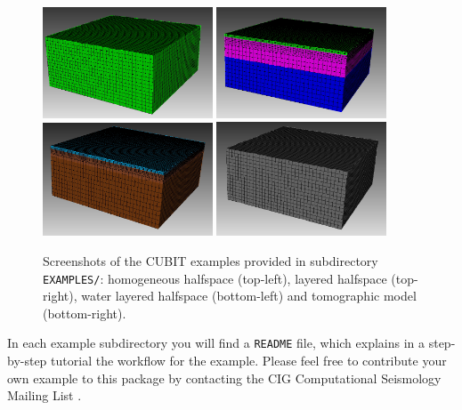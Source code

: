 \begin{figure}[htbp]
\begin{centering}
\includegraphics[width=0.45\textwidth]{figures/example-homogeneous.jpg}
\includegraphics[width=0.45\textwidth]{figures/example-2layers.jpg} \\
\includegraphics[width=0.45\textwidth]{figures/example-water.jpg}
\includegraphics[width=0.45\textwidth]{figures/example-tomo.jpg}
\par
\end{centering}
\caption{Screenshots of the CUBIT examples provided in subdirectory \texttt{EXAMPLES/}:
homogeneous halfspace (top-left), layered halfspace (top-right), water
layered halfspace (bottom-left) and tomographic model (bottom-right).}
\label{fig:examples.cubit}
\end{figure}


In each example subdirectory you will find a \texttt{README} file,
which explains in a step-by-step tutorial the workflow for the example.
Please feel free to contribute your own example to this package by
contacting the CIG Computational Seismology Mailing List .

